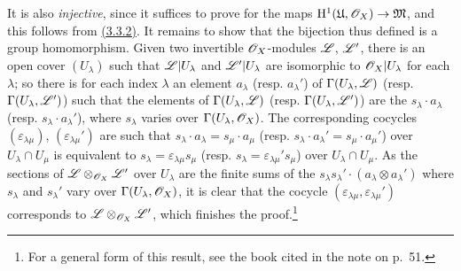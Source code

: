 \begin{env}[5.4.7]
It is also {\em injective}, since it suffices to prove for the maps
$\mathrm{H}^1(\mathfrak{U},\mathscr{O}_X)\to\mathfrak{M}$, and this follows from
\hyperref[env-0.3.3.2]{(3.3.2)}. It remains to show that
the bijection thus defined is a group homomorphism. Given two invertible
$\mathscr{O}_X$-modules $\mathscr{L}$, $\mathscr{L}'$, there is an open cover $(U_\lambda)$ such
that $\mathscr{L}|U_\lambda$ and $\mathscr{L}'|U_\lambda$ are isomorphic to
$\mathscr{O}_X|U_\lambda$ for each $\lambda$; so there is for each index $\lambda$ an
element $a_\lambda$ (resp. $a_\lambda'$) of $\Gamma(U_\lambda,\mathscr{L})$
(resp. $\Gamma(U_\lambda,\mathscr{L}')$) such that the elements of
$\Gamma(U_\lambda,\mathscr{L})$ (resp. $\Gamma(U_\lambda,\mathscr{L}')$) are the
$s_\lambda\cdot a_\lambda$ (resp. $s_\lambda\cdot a_\lambda'$), where
$s_\lambda$ varies over $\Gamma(U_\lambda,\mathscr{O}_X)$. The corresponding cocycles
$(\varepsilon_{\lambda\mu})$, $(\varepsilon_{\lambda\mu}')$ are such that
$s_\lambda\cdot a_\lambda=s_\mu\cdot a_\mu$
(resp. $s_\lambda\cdot a_\lambda'=s_\mu\cdot a_\mu'$) over $U_\lambda\cap U_\mu$
is equivalent to $s_\lambda=\varepsilon_{\lambda\mu}s_\mu$
(resp. $s_\lambda=\varepsilon_{\lambda\mu}' s_\mu$) over $U_\lambda\cap U_\mu$.
As the sections of $\mathscr{L}\otimes_{\mathscr{O}_X}\mathscr{L}'$ over $U_\lambda$ are the
finite sums of the $s_\lambda s_\lambda'\cdot(a_\lambda\otimes a_\lambda')$
where $s_\lambda$ and $s_\lambda'$ vary over $\Gamma(U_\lambda,\mathscr{O}_X)$, it is
clear that the cocycle $(\varepsilon_{\lambda\mu},\varepsilon_{\lambda\mu}')$
corresponds to $\mathscr{L}\otimes_{\mathscr{O}_X}\mathscr{L}'$, which finishes the
proof.\footnote{For a general form of this result, see the book cited in the
note on p.~51.}
\end{env}

